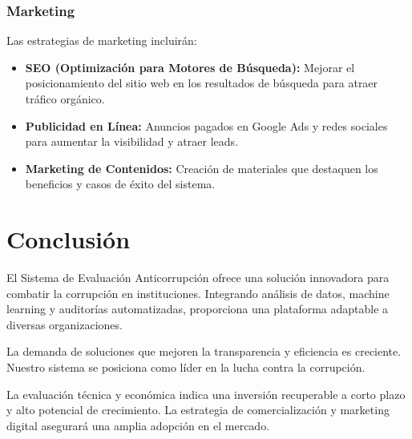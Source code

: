 \documentclass[a4paper,12pt]{article}
\begin{document}
\subsubsection{Marketing}
Las estrategias de marketing incluirán:

\begin{itemize}
    \item \textbf{SEO (Optimización para Motores de Búsqueda):} Mejorar el posicionamiento del sitio web en los resultados de búsqueda para atraer tráfico orgánico.
    \item \textbf{Publicidad en Línea:} Anuncios pagados en Google Ads y redes sociales para aumentar la visibilidad y atraer leads.
    \item \textbf{Marketing de Contenidos:} Creación de materiales que destaquen los beneficios y casos de éxito del sistema.
\end{itemize}

\section{Conclusión}
El Sistema de Evaluación Anticorrupción ofrece una solución innovadora para combatir la corrupción en instituciones. Integrando análisis de datos, machine learning y auditorías automatizadas, proporciona una plataforma adaptable a diversas organizaciones.

La demanda de soluciones que mejoren la transparencia y eficiencia es creciente. Nuestro sistema se posiciona como líder en la lucha contra la corrupción.

La evaluación técnica y económica indica una inversión recuperable a corto plazo y alto potencial de crecimiento. La estrategia de comercialización y marketing digital asegurará una amplia adopción en el mercado.
\end{document}
